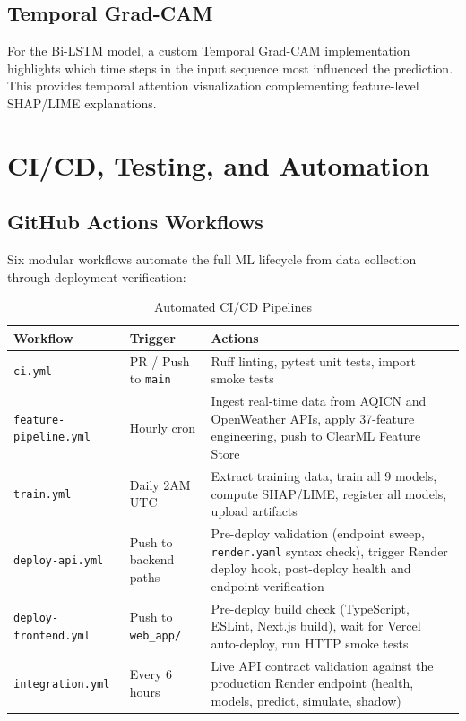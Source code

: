 \documentclass[12pt, a4paper, oneside]{article}
\begin{document}
\subsection{Temporal Grad-CAM}

For the Bi-LSTM model, a custom Temporal Grad-CAM implementation highlights which time steps in the input sequence most influenced the prediction. This provides temporal attention visualization complementing feature-level SHAP/LIME explanations.

\section{CI/CD, Testing, and Automation}

\subsection{GitHub Actions Workflows}

Six modular workflows automate the full ML lifecycle from data collection through deployment verification:

\begin{table}[H]
\centering
\caption{Automated CI/CD Pipelines}
\label{tab:cicd}
\begin{tabularx}{\textwidth}{l l X}
\toprule
\textbf{Workflow} & \textbf{Trigger} & \textbf{Actions} \\
\midrule
\texttt{ci.yml} & PR / Push to \texttt{main} & Ruff linting, pytest unit tests, import smoke tests \\
\texttt{feature-pipeline.yml} & Hourly cron & Ingest real-time data from AQICN and OpenWeather APIs, apply 37-feature engineering, push to ClearML Feature Store \\
\texttt{train.yml} & Daily 2AM UTC & Extract training data, train all 9 models, compute SHAP/LIME, register all models, upload artifacts \\
\texttt{deploy-api.yml} & Push to backend paths & Pre-deploy validation (endpoint sweep, \texttt{render.yaml} syntax check), trigger Render deploy hook, post-deploy health and endpoint verification \\
\texttt{deploy-frontend.yml} & Push to \texttt{web\_app/} & Pre-deploy build check (TypeScript, ESLint, Next.js build), wait for Vercel auto-deploy, run HTTP smoke tests \\
\texttt{integration.yml} & Every 6 hours & Live API contract validation against the production Render endpoint (health, models, predict, simulate, shadow) \\
\bottomrule
\end{tabularx}
\end{table}
\end{document}
